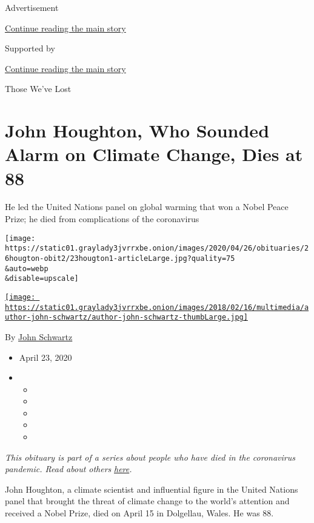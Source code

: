 Advertisement

\protect\hyperlink{after-top}{Continue reading the main story}

Supported by

\protect\hyperlink{after-sponsor}{Continue reading the main story}

Those We've Lost

\hypertarget{john-houghton-who-sounded-alarm-on-climate-change-dies-at-88}{%
\section{John Houghton, Who Sounded Alarm on Climate Change, Dies at
88}\label{john-houghton-who-sounded-alarm-on-climate-change-dies-at-88}}

He led the United Nations panel on global warming that won a Nobel Peace
Prize; he died from complications of the coronavirus

\texttt{[image: https://static01.graylady3jvrrxbe.onion/images/2020/04/26/obituaries/26hougton-obit2/23hougton1-articleLarge.jpg?quality=75\\\&auto=webp\\\&disable=upscale]}

\href{https://www.nytimes3xbfgragh.onion/by/john-schwartz}{\texttt{[image: https://static01.graylady3jvrrxbe.onion/images/2018/02/16/multimedia/author-john-schwartz/author-john-schwartz-thumbLarge.jpg]}}

By \href{https://www.nytimes3xbfgragh.onion/by/john-schwartz}{John
Schwartz}

\begin{itemize}
\item
  April 23, 2020
\item
  \begin{itemize}
  \item
  \item
  \item
  \item
  \item
  \end{itemize}
\end{itemize}

\emph{This obituary is part of a series about people who have died in
the coronavirus pandemic. Read about others}
\href{https://www.nytimes3xbfgragh.onion/series/people-who-have-died-of-the-coronavirus}{\emph{here}}\emph{.}

John Houghton, a climate scientist and influential figure in the United
Nations panel that brought the threat of climate change to the world's
attention and received a Nobel Prize, died on April 15 in Dolgellau,
Wales. He was 88.

